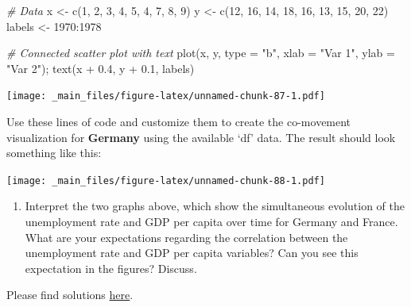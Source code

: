 \documentclass[
  12pt,
  oneside]{book}
\newenvironment{Shaded}{\begin{snugshade}}{\end{snugshade}}
\newcommand{\AttributeTok}[1]{\textcolor[rgb]{0.77,0.63,0.00}{#1}}
\newcommand{\CommentTok}[1]{\textcolor[rgb]{0.56,0.35,0.01}{\textit{#1}}}
\newcommand{\DecValTok}[1]{\textcolor[rgb]{0.00,0.00,0.81}{#1}}
\newcommand{\FloatTok}[1]{\textcolor[rgb]{0.00,0.00,0.81}{#1}}
\newcommand{\FunctionTok}[1]{\textcolor[rgb]{0.00,0.00,0.00}{#1}}
\newcommand{\NormalTok}[1]{#1}
\newcommand{\OtherTok}[1]{\textcolor[rgb]{0.56,0.35,0.01}{#1}}
\newcommand{\SpecialCharTok}[1]{\textcolor[rgb]{0.00,0.00,0.00}{#1}}
\newcommand{\StringTok}[1]{\textcolor[rgb]{0.31,0.60,0.02}{#1}}
\providecommand{\tightlist}{%
  \setlength{\itemsep}{0pt}\setlength{\parskip}{0pt}}
\theoremstyle{definition}
\theoremstyle{definition}
\theoremstyle{definition}
\theoremstyle{definition}
\theoremstyle{remark}
\begin{document}
\begin{Shaded}
\begin{Highlighting}[]
\CommentTok{\# Data}
\NormalTok{x }\OtherTok{\textless{}{-}} \FunctionTok{c}\NormalTok{(}\DecValTok{1}\NormalTok{, }\DecValTok{2}\NormalTok{, }\DecValTok{3}\NormalTok{, }\DecValTok{4}\NormalTok{, }\DecValTok{5}\NormalTok{, }\DecValTok{4}\NormalTok{, }\DecValTok{7}\NormalTok{, }\DecValTok{8}\NormalTok{, }\DecValTok{9}\NormalTok{)}
\NormalTok{y }\OtherTok{\textless{}{-}} \FunctionTok{c}\NormalTok{(}\DecValTok{12}\NormalTok{, }\DecValTok{16}\NormalTok{, }\DecValTok{14}\NormalTok{, }\DecValTok{18}\NormalTok{, }\DecValTok{16}\NormalTok{, }\DecValTok{13}\NormalTok{, }\DecValTok{15}\NormalTok{, }\DecValTok{20}\NormalTok{, }\DecValTok{22}\NormalTok{)}
\NormalTok{labels }\OtherTok{\textless{}{-}} \DecValTok{1970}\SpecialCharTok{:}\DecValTok{1978}

\CommentTok{\# Connected scatter plot with text}
\FunctionTok{plot}\NormalTok{(x, y, }\AttributeTok{type =} \StringTok{"b"}\NormalTok{, }\AttributeTok{xlab =} \StringTok{"Var 1"}\NormalTok{, }\AttributeTok{ylab =} \StringTok{"Var 2"}\NormalTok{); }\FunctionTok{text}\NormalTok{(x }\SpecialCharTok{+} \FloatTok{0.4}\NormalTok{, y }\SpecialCharTok{+} \FloatTok{0.1}\NormalTok{, labels) }
\end{Highlighting}
\end{Shaded}

\texttt{[image: \_main\_files/figure-latex/unnamed-chunk-87-1.pdf]}

Use these lines of code and customize them to create the co-movement visualization for \textbf{Germany} using the available `df' data.
The result should look something like this:

\texttt{[image: \_main\_files/figure-latex/unnamed-chunk-88-1.pdf]}

\begin{enumerate}
\def\labelenumi{(\arabic{enumi})}
\setcounter{enumi}{23}
\tightlist
\item
  Interpret the two graphs above, which show the simultaneous evolution of the unemployment rate and GDP per capita over time for Germany and France. What are your expectations regarding the correlation between the unemployment rate and GDP per capita variables? Can you see this expectation in the figures? Discuss.
\end{enumerate}

Please find solutions \href{https://raw.githubusercontent.com/hubchev/courses/main/scr/un_gdp_ger_fra.R}{here}.
\end{document}
